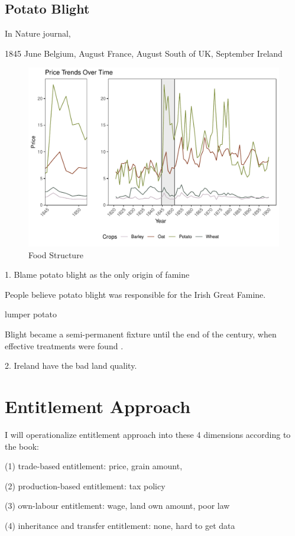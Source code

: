 \subsection{Potato Blight}

In Nature journal,

1845 June Belgium, August France, August South of UK, September Ireland

\begin{figure}[h]
    \centering
    \caption{Food Structure}
    \includegraphics[width=.95\textwidth]{../03_outputs/grain_price.pdf}
\end{figure}



1. Blame potato blight as the only origin of famine

People believe potato blight was responsible for the Irish Great Famine. 

lumper potato

Blight became a semi-permanent fixture until the end of the century, when effective treatments were found \citep{o1994economic}.

2. Ireland have the bad land quality.

\section{Entitlement Approach}

I will operationalize entitlement approach into these 4 dimensions according to the book:

(1) trade-based entitlement: price, grain amount, 

(2) production-based entitlement: tax policy

(3) own-labour entitlement: wage, land own amount, poor law

(4) inheritance and transfer entitlement: none, hard to get data




